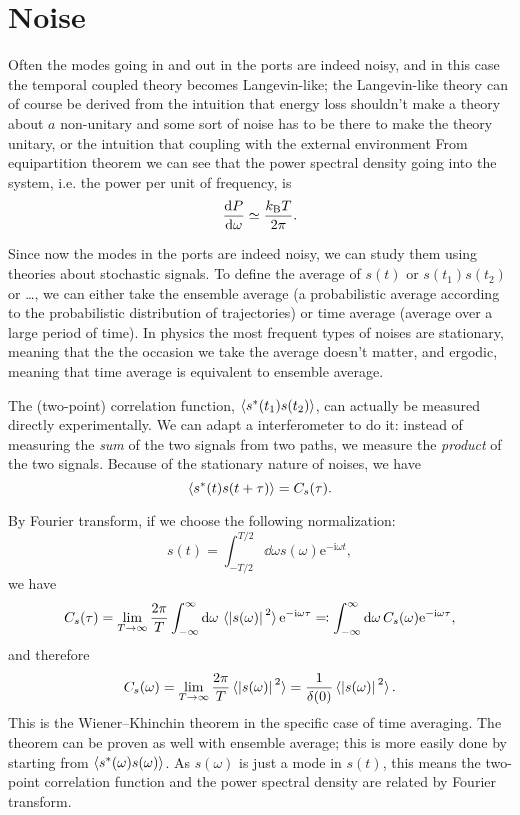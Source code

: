 \documentclass[hyperref, a4paper]{article}
\newcommand*{\ii}{\mathrm{i}}
\newcommand*{\ee}{\mathrm{e}}
\newcommand*{\kB}{k_{\text{B}}}
\begin{document}
\section{Noise}

Often the modes going in and out in the ports are indeed noisy, 
and in this case the temporal coupled theory becomes Langevin-like; 
the Langevin-like theory can of course be derived from 
the intuition that energy loss shouldn't make a theory about $a$  non-unitary 
and some sort of noise has to be there to make the theory unitary, 
or the intuition that coupling with the external environment 
From equipartition theorem we can see that the power spectral density going into the system, 
i.e. the power per unit of frequency, is 
\begin{equation}
    \dv{P}{\omega} \simeq \frac{\kB T}{2 \pi}.
\end{equation}

Since now the modes in the ports are indeed noisy, 
we can study them using theories about stochastic signals.
To define the average of $s(t)$ or $s(t_1) s(t_2)$ or \dots,
we can either take the ensemble average 
(a probabilistic average according to the probabilistic distribution of trajectories) 
or time average (average over a large period of time).
In physics the most frequent types of noises are stationary, 
meaning that the the occasion we take the average doesn't matter, 
and ergodic, meaning that time average is equivalent to ensemble average. 

The (two-point) correlation function, $\expval{s^*(t_1) s(t_2)}$, 
can actually be measured directly experimentally.
We can adapt a interferometer to do it: 
instead of measuring the \emph{sum} of the two signals from two paths, 
we measure the \emph{product} of the two signals.
Because of the stationary nature of noises, 
we have 
\begin{equation}
    \expval{s^*(t) s(t + \tau)} = C_s(\tau).
\end{equation}

By Fourier transform, if we choose the following normalization: 
\begin{equation}
    s(t) = \int_{-T/2}^{T/2} \dd{\omega} s(\omega) \ee^{- \ii \omega t}, 
\end{equation}
we have 
\begin{equation}
    C_s(\tau) = \lim_{T \to \infty} \frac{2\pi}{T} 
    \int_{-\infty}^{\infty} \dd{\omega} \expval*{\abs*{s(\omega)}^2} \ee^{- \ii \omega \tau}
    \eqqcolon \int_{-\infty}^{\infty} \dd{\omega} C_s(\omega) \ee^{- \ii \omega \tau},
\end{equation}
and therefore 
\begin{equation}
    C_s(\omega) = \lim_{T \to \infty} \frac{2\pi}{T} \expval*{\abs*{s(\omega)}^2}
    = \frac{1}{\delta(0)} \expval*{\abs*{s(\omega)}^2}.
\end{equation}
This is the Wiener–Khinchin theorem in the specific case of time averaging.
The theorem can be proven as well with ensemble average; 
this is more easily done by starting from $\expval{s^*(\omega) s(\omega)}$. 
As $s(\omega)$ is just a mode in $s(t)$, 
this means the two-point correlation function and the power spectral density 
are related by Fourier transform.
\end{document}
